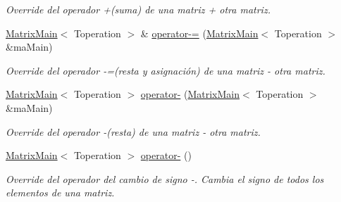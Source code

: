 \begin{DoxyCompactItemize}
\begin{DoxyCompactList}\small\item\em Override del operador +(suma) de una matriz + otra matriz. \end{DoxyCompactList}\item 
\hyperlink{classMatrixMain}{Matrix\+Main}$<$ Toperation $>$ \& \hyperlink{classMatrixMain_a9c12a483991f3b4d90f95e1ca09a4174}{operator-\/=} (\hyperlink{classMatrixMain}{Matrix\+Main}$<$ Toperation $>$ \&ma\+Main)
\begin{DoxyCompactList}\small\item\em Override del operador -\/=(resta y asignación) de una matriz -\/ otra matriz. \end{DoxyCompactList}\item 
\hyperlink{classMatrixMain}{Matrix\+Main}$<$ Toperation $>$ \hyperlink{classMatrixMain_ac3ec4e4edf0d77e97cd8b4c8ecfc32ee}{operator-\/} (\hyperlink{classMatrixMain}{Matrix\+Main}$<$ Toperation $>$ \&ma\+Main)
\begin{DoxyCompactList}\small\item\em Override del operador -\/(resta) de una matriz -\/ otra matriz. \end{DoxyCompactList}\item 
\hyperlink{classMatrixMain}{Matrix\+Main}$<$ Toperation $>$ \hyperlink{classMatrixMain_aef5fed2f8190d857c39ed911601910c2}{operator-\/} ()
\begin{DoxyCompactList}\small\item\em Override del operador del cambio de signo -\/. Cambia el signo de todos los elementos de una matriz. \end{DoxyCompactList}\end{DoxyCompactItemize}
